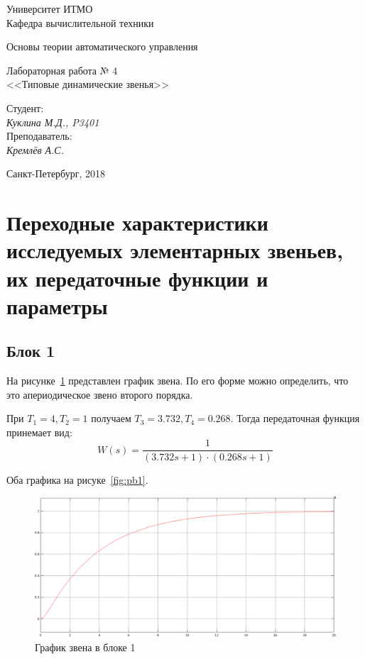 \documentclass[12pt, a4paper] {ncc}
\begin{document}
\setcounter{figure}{0}
\frenchspacing
\pagestyle{empty}
\begin{center}
                            Университет ИТМО    \\
                        Кафедра вычислительной техники

			Основы теории автоматического управления
\end{center}
\begin{center}
			Лабораторная работа № 4 \\
<<Типовые динамические звенья>>
\end{center}
\begin{flushright}
                                    Студент:\\
                                    {\it Куклина М.Д., P3401}\\
                                    Преподаватель: \\
                                    {\it Кремлёв А.С.}
\end{flushright}
\begin{center}
                             Санкт-Петербург, 2018
\end{center}
\newpage

\section{Переходные характеристики исследуемых элементарных звеньев, их передаточные функции и параметры}

    \subsection{Блок 1}
		На рисунке~\ref{fig:p1} представлен график звена. По его форме можно определить,
		что это апериодическое звено второго порядка.

		При $T_1 = 4, T_2 = 1$ получаем $T_3 = 3.732, T_4 = 0.268$. Тогда
		передаточная функция принемает вид:
		\[ W(s) = \dfrac {1} {(3.732 s + 1) \cdot (0.268 s + 1)}\]

		Оба графика на рисуке~\ref{fig:pb1}.

    	\begin{figure}[ht!]
    		\includegraphics[scale=0.3]{./plot1.png}
			\caption{График звена в блоке 1}
			\label{fig:p1}
    	\end{figure}
\end{document}
